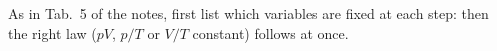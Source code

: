 \documentclass{ibetest}
\begin{document}
\begin{scheme}
\end{scheme}
\begin{tip}
As in Tab.~5 of the notes, first list which variables are fixed at each step: then the right
law ($pV$, $p/T$ or $V/T$ constant) follows at once.
\end{tip}

\finish
\end{document}
